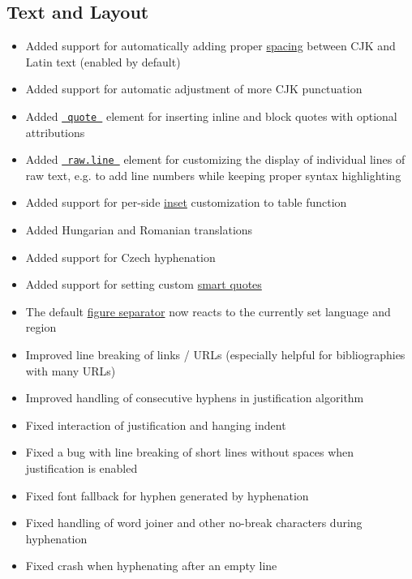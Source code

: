 \subsection{Text and Layout}\label{text-and-layout}

\begin{itemize}
\tightlist
\item
  Added support for automatically adding proper
  \href{/docs/reference/text/text/\#parameters-cjk-latin-spacing}{spacing}
  between CJK and Latin text (enabled by default)
\item
  Added support for automatic adjustment of more CJK punctuation
\item
  Added \href{/docs/reference/model/quote/}{\texttt{\ quote\ }} element
  for inserting inline and block quotes with optional attributions
\item
  Added
  \href{/docs/reference/text/raw/\#definitions-line}{\texttt{\ raw.line\ }}
  element for customizing the display of individual lines of raw text,
  e.g. to add line numbers while keeping proper syntax highlighting
\item
  Added support for per-side
  \href{/docs/reference/model/table/\#parameters-inset}{inset}
  customization to table function
\item
  Added Hungarian and Romanian translations
\item
  Added support for Czech hyphenation
\item
  Added support for setting custom
  \href{/docs/reference/text/smartquote/}{smart quotes}
\item
  The default
  \href{/docs/reference/model/figure/\#definitions-caption-separator}{figure
  separator} now reacts to the currently set language and region
\item
  Improved line breaking of links / URLs (especially helpful for
  bibliographies with many URLs)
\item
  Improved handling of consecutive hyphens in justification algorithm
\item
  Fixed interaction of justification and hanging indent
\item
  Fixed a bug with line breaking of short lines without spaces when
  justification is enabled
\item
  Fixed font fallback for hyphen generated by hyphenation
\item
  Fixed handling of word joiner and other no-break characters during
  hyphenation
\item
  Fixed crash when hyphenating after an empty line

\end{itemize}
